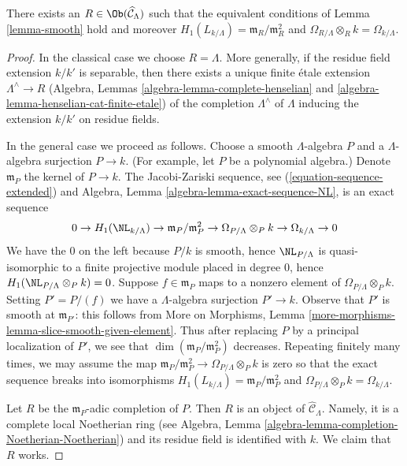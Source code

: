 \begin{lemma}
\label{lemma-exists-smooth}
There exists an $R \in \Ob(\widehat{\mathcal{C}}_\Lambda)$
such that the equivalent conditions of Lemma \ref{lemma-smooth}
hold and moreover $H_1(L_{k/\Lambda}) = \mathfrak m_R/\mathfrak m_R^2$
and $\Omega_{R/\Lambda} \otimes_R k = \Omega_{k/\Lambda}$.
\end{lemma}

\begin{proof}
In the classical case we choose $R = \Lambda$. More generally, if
the residue field extension $k/k'$ is separable, then there exists
a unique finite \'etale extension $\Lambda^\wedge \to R$
(Algebra, Lemmas \ref{algebra-lemma-complete-henselian} and
\ref{algebra-lemma-henselian-cat-finite-etale})
of the completion $\Lambda^\wedge$ of $\Lambda$
inducing the extension $k/k'$ on residue fields.

\medskip\noindent
In the general case we proceed as follows. Choose a smooth
$\Lambda$-algebra $P$ and a $\Lambda$-algebra surjection $P \to k$.
(For example, let $P$ be a polynomial algebra.)
Denote $\mathfrak m_P$ the kernel of $P \to k$. The Jacobi-Zariski sequence,
see (\ref{equation-sequence-extended}) and 
Algebra, Lemma \ref{algebra-lemma-exact-sequence-NL}, is an
exact sequence
$$
0 \to H_1(\NL_{k/\Lambda}) \to
\mathfrak m_P/\mathfrak m_P^2 \to
\Omega_{P/\Lambda} \otimes_P k \to
\Omega_{k/\Lambda} \to 0
$$
We have the $0$ on the left because $P/k$ is smooth, hence
$\NL_{P/\Lambda}$ is quasi-isomorphic to a finite projective module
placed in degree $0$, hence $H_1(\NL_{P/\Lambda} \otimes_P k) = 0$.
Suppose $f \in \mathfrak m_P$ maps to a nonzero element
of $\Omega_{P/\Lambda} \otimes_P k$. Setting $P' = P/(f)$ we have a
$\Lambda$-algebra surjection $P' \to k$.
Observe that $P'$ is smooth at $\mathfrak m_{P'}$:
this follows from More on Morphisms, Lemma
\ref{more-morphisms-lemma-slice-smooth-given-element}.
Thus after replacing $P$ by a principal localization
of $P'$, we see that $\dim(\mathfrak m_P/\mathfrak m_P^2)$
decreases. Repeating finitely many times, we may assume
the map $\mathfrak m_P/\mathfrak m_P^2 \to
\Omega_{P/\Lambda} \otimes_P k$ is zero so that
the exact sequence breaks into isomorphisms
$H_1(L_{k/\Lambda}) = \mathfrak m_P/\mathfrak m_P^2$ and
$\Omega_{P/\Lambda} \otimes_P k = \Omega_{k/\Lambda}$.

\medskip\noindent
Let $R$ be the $\mathfrak m_P$-adic completion of $P$.
Then $R$ is an object of $\widehat{\mathcal{C}}_\Lambda$.
Namely, it is a complete local Noetherian ring (see
Algebra, Lemma \ref{algebra-lemma-completion-Noetherian-Noetherian})
and its residue field is identified with $k$.
We claim that $R$ works.


\end{proof}

